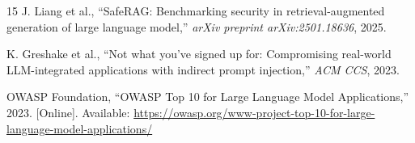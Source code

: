\documentclass[conference]{IEEEtran}
\begin{document}
\begin{thebibliography}{15}
J. Liang et al., ``SafeRAG: Benchmarking security in retrieval-augmented generation of large language model,'' \textit{arXiv preprint arXiv:2501.18636}, 2025.

K. Greshake et al., ``Not what you've signed up for: Compromising real-world LLM-integrated applications with indirect prompt injection,'' \textit{ACM CCS}, 2023.

OWASP Foundation, ``OWASP Top 10 for Large Language Model Applications,'' 2023. [Online]. Available: \url{https://owasp.org/www-project-top-10-for-large-language-model-applications/}

\end{thebibliography}
\end{document}
